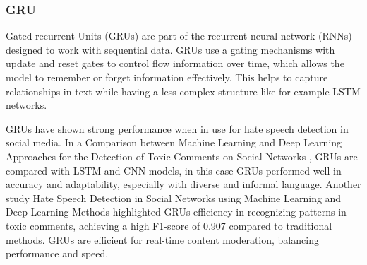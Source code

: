 \subsubsection{GRU}

\noindent
Gated recurrent Units (GRUs) are part of the recurrent neural network (RNNs) designed to work with sequential data. GRUs use a gating mechanisms with update and reset gates to control flow information over time, which allows the model to remember or forget information effectively. This helps to capture relationships in text while having a less complex structure like for example LSTM networks.

GRUs have shown strong performance when in use for hate speech detection in social media. In a Comparison between Machine Learning and Deep Learning Approaches for the Detection of Toxic Comments on Social Networks \citep{bonetti2023comparison}, GRUs are compared with LSTM and CNN models, in this case GRUs performed well in accuracy and adaptability, especially with diverse and informal language. Another study Hate Speech Detection in Social Networks using Machine Learning and Deep Learning Methods highlighted GRUs efficiency in recognizing patterns in toxic comments, achieving a high F1-score of 0.907 compared to traditional methods. GRUs are efficient for real-time content moderation, balancing performance and speed.